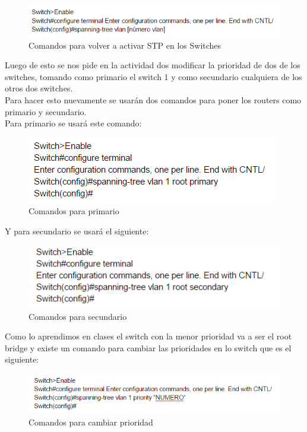 \documentclass[onecolumn,11pts]{IEEEtran}
\begin{document}
\begin{figure}[h!]
\centering
 \includegraphics[scale=0.8]{com-stpon}
\caption{Comandos para volver a activar STP en los Switches}
\label{fig:com-stpon}
\end{figure}
Luego de esto se nos pide en la actividad dos modificar la prioridad de dos de los switches, tomando como primario el switch 1 y como secundario cualquiera de los otros dos switches.\\
Para hacer esto nuevamente se usarán dos comandos para poner los routers como primario y secundario.\\
Para primario se usará este comando:
\begin{figure}[h!]
\centering
 \includegraphics[scale=0.8]{stpprimary}
\caption{Comandos para primario}
\label{fig:stpprimary}
\end{figure}
Y para secundario se usará el siguiente:
\begin{figure}[h!]
\centering
 \includegraphics[scale=0.8]{stpsecondary}
\caption{Comandos para secundario}
\label{fig:stpsecondary}
\end{figure}

Como lo aprendimos en clases el switch con la menor prioridad  va a ser el root bridge y existe un comando para cambiar las prioridades en lo switch que es el siguiente:

\begin{figure}[h!]
\centering
 \includegraphics[scale=0.8]{stpprority}
\caption{Comandos para cambiar prioridad}
\label{fig:stpprority}
\end{figure}
\end{document}
